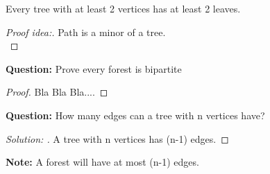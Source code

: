 \documentclass{article}
\begin{document}
\begin{theorem}
    Every tree with at least 2 vertices has at least 2 leaves.
    \begin{proof}[Proof idea:]
        Path is a minor of a tree. \\
    \end{proof}
\end{theorem}
\begin{text}
{\textbf {Question: }Prove every forest is bipartite}
    \begin{proof}
        Bla Bla Bla....       
    \end{proof}
\end{text}
\begin{text}
{\textbf {Question: }How many edges can a tree with n vertices have?}
    \begin{proof}[Solution: ]
        A tree with n vertices has (n-1) edges.       
    \end{proof}
    {\textbf {Note: }A forest will have at most (n-1) edges.}
    
\end{text}
\end{document}
